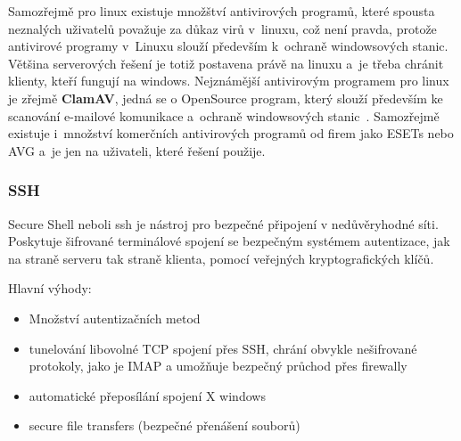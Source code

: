 \documentclass[a4paper,12pt]{article}
\renewcommand{\b}[1]{\textbf{#1}} %
\begin{document}
Samozřejmě pro linux existuje množštví antivirových programů, které spousta neznalých uživatelů považuje za důkaz virů v~linuxu, což není pravda, protože antivirové programy v~Linuxu slouží především k~ochraně windowsových stanic. Většina serverových řešení je totiž postavena právě na linuxu a~je třeba chránit klienty, kteří fungují na windows. Nejznámější antivirovým programem pro linux je zřejmě \b{ClamAV}, jedná se o OpenSource program, který slouží především ke scanování e-mailové komunikace a~ochraně windowsových stanic~\cite{ClamAV}. Samozřejmě existuje i~množství komerčních antivirových programů od firem jako ESETs nebo AVG a~je jen na uživateli, které řešení použije.

\subsubsection{SSH}
Secure Shell neboli ssh je nástroj pro bezpečné připojení v nedůvěryhodné síti. Poskytuje šifrované terminálové spojení se bezpečným systémem autentizace, jak na straně serveru tak straně klienta, pomocí veřejných kryptografických klíčů.

Hlavní výhody:
\begin{itemize}
 \item Množství autentizačních metod
 \item tunelování libovolné TCP spojení přes SSH, chrání obvykle nešifrované protokoly, jako je IMAP a umožňuje bezpečný průchod přes firewally
 \item automatické přeposílání spojení X windows
 \item secure file transfers (bezpečné přenášení souborů)
\end{itemize}
\end{document}
